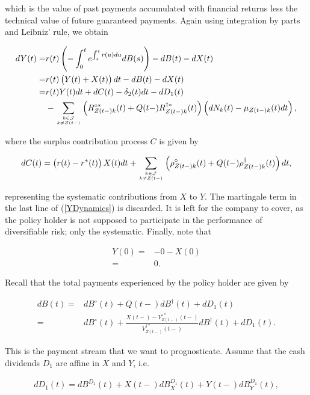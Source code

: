 \documentclass{article}
\newcommand{\1}[1]{\mathbbm{1}_{\left\lbrace #1 \right\rbrace}}
\theoremstyle{break}
\theoremstyle{remark}
\numberwithin{equation}{section}
\begin{document}
which is the value of past payments accumulated with financial returns less the technical value of future guaranteed payments. Again using integration by parts and Leibniz' rule, we obtain

\begin{align} \label{YDynamics}
\begin{split}
	dY(t) =& r(t) \left( - \int_0^t e^{\int_s^t r(u) du} dB(s) \right) - dB(t) - dX(t) \\
	=& r(t) \left( Y(t) + X(t) \right)dt - dB(t) - dX(t) \\
	=& r(t) Y(t) dt + dC(t) - \delta_2(t)dt - dD_1(t) \\
	&- \sum_{k \in \mathcal{J} \atop k \neq Z(t-)} \left( R_{Z(t-)k}^{\circ*}(t) + Q(t-) R_{Z(t-)k}^{\dagger*}(t) \right) \left( dN_k(t) - \mu_{Z(t-)k}(t) dt \right),
\end{split}
\end{align}

 where the surplus contribution process $C$ is given by

\begin{align*}
	dC(t) = \left( r(t) - r^*(t) \right) X(t) dt + \sum_{k \in \mathcal{J} \atop k \neq Z(t-)} \left( \rho_{Z(t-)k}^\circ(t) + Q(t-) \rho_{Z(t-)k}^\dagger(t) \right) dt,
\end{align*}

representing the systematic contributions from $X$ to $Y$. The martingale term in the last line of (\ref{YDynamics}) is discarded. It is left for the company to cover, as the policy holder is not supposed to participate in the performance of diversifiable risk; only the systematic. Finally, note that

\begin{align*}
	Y(0) =& - 0 - X(0) \\
	=& 0.
\end{align*}

Recall that the total payments experienced by the policy holder are given by

\begin{align*}
dB(t) =& dB^\circ(t) + Q(t-) dB^\dagger(t) + dD_1(t)\\
=& dB^\circ(t) + \frac{X(t-) - V_{Z(t-)}^{\circ*}(t-)}{V_{Z(t-)}^{\dagger*}(t-)} dB^\dagger(t) + dD_1(t).
\end{align*}

This is the payment stream that we want to prognosticate. Assume that the cash dividends $D_1$ are affine in $X$ and $Y$, i.e.

\begin{align} \label{LinearCashDiv}
dD_1(t) = dB^{D_1}(t) + X(t-) dB_X^{D_1}(t) + Y(t-)dB_Y^{D_1}(t),
\end{align}
\end{document}
